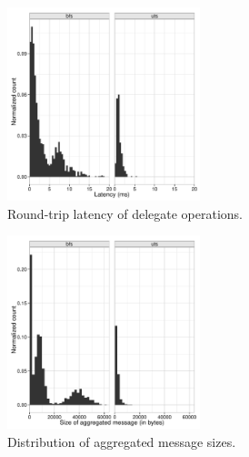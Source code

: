 \begin{figure}[ht]
    \begin{center}
      \includegraphics[width=0.5\textwidth]{results/histograms/latency_cmb.pdf}
    \end{center}
    \caption{Round-trip latency of delegate operations.}
    \label{fig:grappa-latency}
\end{figure}

\begin{figure}[ht]
    \begin{center}
      \includegraphics[width=0.5\textwidth]{results/histograms/rdma_bytes_sent_histogram_cmb.pdf}
    \end{center}
    \caption{Distribution of aggregated message sizes.}
    \label{fig:grappa-message-size}
\end{figure}




















